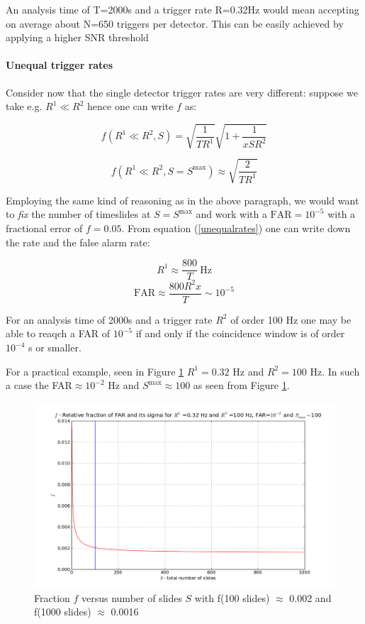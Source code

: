 \documentclass[epsf]{article}
\begin{document}
An analysis time of T=2000s and a trigger rate R=0.32Hz would mean accepting on average about N=650 triggers per detector. This can be easily achieved by applying a higher SNR threshold

\paragraph{Unequal trigger rates}
Consider now that the single detector trigger rates are very different: suppose we take e.g. $R^1 \ll R^2$ hence one can write $f$ as:

\begin{equation}
f(R^1 \ll R^2, S) = \sqrt{\frac{1}{T R^1}} \sqrt{1 + \frac{1}{xSR^2}}
\end{equation}

\begin{equation}
\label{unequalrates}
f(R^1 \ll R^2, S=S^{\mathrm{max}}) \approx \sqrt{\frac{2}{TR^1}}
\end{equation}

Employing the same kind of reasoning as in the above paragraph, we would want to \emph{fix} the number of timeslides at $S=S^{\mathrm{max}}$ and work with a $\mathrm{FAR}=10^{-5}$ with a fractional error of $f=0.05$. From equation (\ref{unequalrates}) one can write down the rate and the false alarm rate:

\begin{equation}
R^1 \approx \frac{800}{T} ~\mathrm{Hz}
\end{equation}
%
\begin{equation}
\mathrm{FAR} \approx \frac{800R^2x}{T} \sim 10^{-5}
\end{equation} 

For an analysis time of 2000s and a trigger rate $R^2$ of order 100 Hz one may be able to reaqch a FAR of $10^{-5}$ if and only if the coincidence window is of order $10^{-4}$ s or smaller.

For a practical example, seen in Figure \ref{figure3} $R^1=0.32$ Hz and $R^2=100$ Hz. In such a case the FAR$\approx 10^{-2}$ Hz and $S^{\mathrm{max}} \approx 100$ as seen from Figure \ref{figure3}. 

\begin{figure}[ht!]
\centering
\includegraphics[scale=0.45]{R=032R=100.png}
\caption{Fraction $f$ versus number of slides $S$ with f(100 slides) $\approx$ 0.002 and f(1000 slides) $\approx$ 0.0016}
\label{figure3}
\end{figure}
\end{document}
